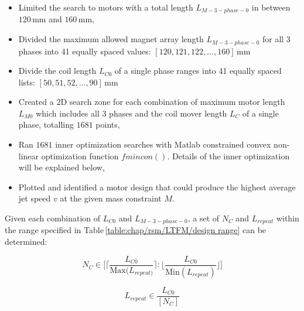                 
                \begin{itemize}
                    \item   Limited the search to motors with a total length $L_{M-3-phase-0}$ in between $120\,\mathrm{mm}$ and $160\,\mathrm{mm}$,
                    \item   Divided the maximum allowed magnet array length $L_{M-3-phase-0}$ for all 3 phases into 41 equally spaced values: $[120, 121, 122, ..., 160]\,\mathrm{mm}$ 
                    \item   Divide the coil length $L_{C0}$ of a single phase ranges into 41 equally spaced lists:  $[50, 51, 52, ..., 90]\,\mathrm{mm}$ 
                    \item   Created a $\mathrm{2D}$ search zone for each combination of maximum motor length $L_{M0}$ which includes all 3 phases and the coil mover length $L_{C}$ of a single phase, totalling $1681$ points,
                    \item   Ran $1681$ inner optimization searches with Matlab constrained convex non-linear optimization function $fmincon()$. Details of the inner optimization will be explained below,
                    \item   Plotted and identified a motor design that could produce the highest average jet speed $v$ at the given mass constraint $M$.
                \end{itemize}
                
                

                
                
                Given each combination of $L_{C0}$ and $L_{M-3-phase-0}$, a set of $N_C$ and $L_{repeat}$ within the range specified in Table\,\ref{table:chap/rsm/LTFM/design range} can be determined:
                
                
                \begin{equation}
                    N_C \in \Bigg[\bigg\lceil {\frac{L_{C0}}{\mathrm{Max}(L_{repeat)}}} \bigg\rceil:\bigg\lfloor{\frac{L_{C0}}{\mathrm{Min}(L_{repeat})}}\bigg\rfloor\Bigg] 
                    \label{eq:chap/rsm/LTFM/list of N_C}
                \end{equation}
            
                
                \begin{equation}
                    L_{repeat} \in \frac{L_{C0}}{[N_C]}
                    \label{eq:chap/rsm/LTFM/list of L_repeat}
                \end{equation}
                
